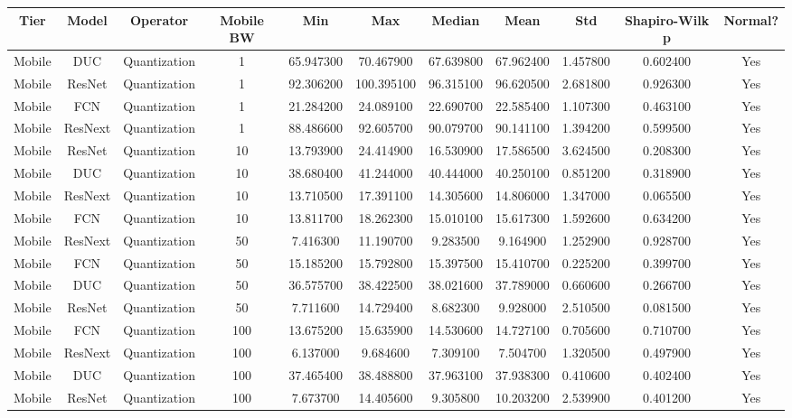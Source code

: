 \begin{tabular}{|c||c||c||c||c||c||c||c||c||c||c|}
\toprule
Tier & Model & Operator & Mobile BW & Min & Max & Median & Mean & Std & Shapiro-Wilk p & Normal? \\
\midrule
Mobile & DUC & Quantization & 1 & 65.947300 & 70.467900 & 67.639800 & 67.962400 & 1.457800 & 0.602400 & Yes \\
Mobile & ResNet & Quantization & 1 & 92.306200 & 100.395100 & 96.315100 & 96.620500 & 2.681800 & 0.926300 & Yes \\
Mobile & FCN & Quantization & 1 & 21.284200 & 24.089100 & 22.690700 & 22.585400 & 1.107300 & 0.463100 & Yes \\
Mobile & ResNext & Quantization & 1 & 88.486600 & 92.605700 & 90.079700 & 90.141100 & 1.394200 & 0.599500 & Yes \\
Mobile & ResNet & Quantization & 10 & 13.793900 & 24.414900 & 16.530900 & 17.586500 & 3.624500 & 0.208300 & Yes \\
Mobile & DUC & Quantization & 10 & 38.680400 & 41.244000 & 40.444000 & 40.250100 & 0.851200 & 0.318900 & Yes \\
Mobile & ResNext & Quantization & 10 & 13.710500 & 17.391100 & 14.305600 & 14.806000 & 1.347000 & 0.065500 & Yes \\
Mobile & FCN & Quantization & 10 & 13.811700 & 18.262300 & 15.010100 & 15.617300 & 1.592600 & 0.634200 & Yes \\
Mobile & ResNext & Quantization & 50 & 7.416300 & 11.190700 & 9.283500 & 9.164900 & 1.252900 & 0.928700 & Yes \\
Mobile & FCN & Quantization & 50 & 15.185200 & 15.792800 & 15.397500 & 15.410700 & 0.225200 & 0.399700 & Yes \\
Mobile & DUC & Quantization & 50 & 36.575700 & 38.422500 & 38.021600 & 37.789000 & 0.660600 & 0.266700 & Yes \\
Mobile & ResNet & Quantization & 50 & 7.711600 & 14.729400 & 8.682300 & 9.928000 & 2.510500 & 0.081500 & Yes \\
Mobile & FCN & Quantization & 100 & 13.675200 & 15.635900 & 14.530600 & 14.727100 & 0.705600 & 0.710700 & Yes \\
Mobile & ResNext & Quantization & 100 & 6.137000 & 9.684600 & 7.309100 & 7.504700 & 1.320500 & 0.497900 & Yes \\
Mobile & DUC & Quantization & 100 & 37.465400 & 38.488800 & 37.963100 & 37.938300 & 0.410600 & 0.402400 & Yes \\
Mobile & ResNet & Quantization & 100 & 7.673700 & 14.405600 & 9.305800 & 10.203200 & 2.539900 & 0.401200 & Yes \\

\end{tabular}
